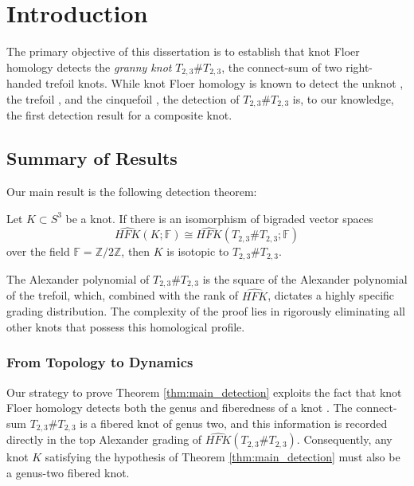 \chapter{Introduction}\label{chap:introduction}

The primary objective of this dissertation is to establish that knot Floer homology detects the \textit{granny knot} $T_{2,3} \# T_{2,3}$, the connect-sum of two right-handed trefoil knots. While knot Floer homology is known to detect the unknot \cite{OS-genus}, the trefoil \cite{Ghi08}, and the cinquefoil \cite{Reinoso2023}, the detection of $T_{2,3} \# T_{2,3}$ is, to our knowledge, the first detection result for a composite knot.

\section{Summary of Results}

Our main result is the following detection theorem:

\begin{theorem} \label{thm:main_detection}
Let $K \subset S^3$ be a knot. If there is an isomorphism of bigraded vector spaces
\[
\widehat{HFK}(K; \mathbb{F}) \cong \widehat{HFK}(T_{2,3} \# T_{2,3}; \mathbb{F})
\]
over the field $\mathbb{F} = \mathbb{Z}/2\mathbb{Z}$, then $K$ is isotopic to $T_{2,3} \# T_{2,3}$.
\end{theorem}

The Alexander polynomial of $T_{2,3} \# T_{2,3}$ is the square of the Alexander polynomial of the trefoil, which, combined with the rank of $\widehat{HFK}$, dictates a highly specific grading distribution. The complexity of the proof lies in rigorously eliminating all other knots that possess this homological profile.

\subsection{From Topology to Dynamics}

Our strategy to prove Theorem \ref{thm:main_detection} exploits the fact that knot Floer homology detects both the genus and fiberedness of a knot \cite{Ni07, Juh08}. The connect-sum $T_{2,3} \# T_{2,3}$ is a fibered knot of genus two, and this information is recorded directly in the top Alexander grading of $\widehat{HFK}(T_{2,3}\#T_{2,3})$. Consequently, any knot $K$ satisfying the hypothesis of Theorem \ref{thm:main_detection} must also be a genus-two fibered knot. 

